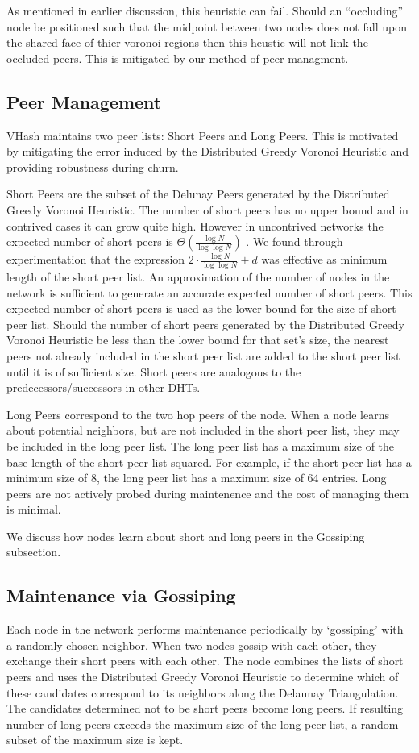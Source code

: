\documentclass{IEEEtran}
\begin{document}
As mentioned in earlier discussion, this heuristic can fail. Should an ``occluding'' node be positioned such that the midpoint between two nodes does not fall upon the shared face of thier voronoi regions then this heustic will not link the occluded peers. %
This is mitigated by our method of peer managment.

\subsection{Peer Management}
VHash maintains two peer lists: Short Peers and Long Peers.
This is motivated by mitigating the error induced by the Distributed Greedy Voronoi Heuristic and providing robustness during churn.

Short Peers are the subset of the Delunay Peers generated by the Distributed Greedy Voronoi Heuristic. 
The number of short peers has no upper bound and in contrived cases it can grow quite high. However in uncontrived networks the expected number of short peers is $\Theta(\frac{\log N}{\log \log N} )$ \cite{bern1991expected}. 
We found through experimentation that the expression $2 \cdot \frac{\log N}{\log \log N} + d$ was effective as  minimum length of the short peer list.
An approximation of the number of nodes in the network is sufficient to generate an accurate expected number of short peers.  
This expected number of short peers is used as the lower bound for the size of short peer list.
Should the number of short peers generated by the Distributed Greedy Voronoi Heuristic be less than the lower bound for that set's size, the nearest peers not already included in the short peer list are added to the short peer list until it is of sufficient size.
Short peers are analogous to the predecessors/successors in other DHTs.

Long Peers correspond to the two hop peers of the node.
When a node learns about potential neighbors, but are not included in the short peer list, they may be included in the long peer list.  
The long peer list has a maximum size of the base length of the short peer list squared.  
For example, if the short peer list has a minimum size of 8, the long peer list has a maximum size of 64 entries.  
Long peers are not actively probed during maintenence and the cost of managing them is minimal.
 
We discuss how nodes learn about short and long peers in the Gossiping subsection.


\subsection{Maintenance via Gossiping}
Each node in the network performs maintenance periodically by `gossiping' with a randomly chosen neighbor.
When two nodes gossip with each other, they exchange their short peers with each other.
The node combines the lists of short peers and uses the  Distributed Greedy Voronoi Heuristic to determine which of these candidates correspond to its neighbors along the Delaunay Triangulation.
The candidates determined not to be short peers become long peers.  
If resulting number of long peers exceeds the maximum size of the long peer list, a random subset of the maximum size is kept.
\end{document}
